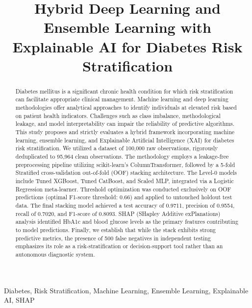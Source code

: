\documentclass[conference]{IEEEtran}
\begin{document}
\title{Hybrid Deep Learning and Ensemble Learning with Explainable AI for Diabetes Risk Stratification}

\author{
}

\maketitle
\begin{abstract}
Diabetes mellitus is a significant chronic health condition for which risk stratification can facilitate appropriate clinical management. Machine learning and deep learning methodologies offer analytical approaches to identify individuals at elevated risk based on patient health indicators. Challenges such as class imbalance, methodological leakage, and model interpretability can impair the reliability of predictive algorithms. This study proposes and strictly evaluates a hybrid framework incorporating machine learning, ensemble learning, and Explainable Artificial Intelligence (XAI) for diabetes risk stratification. We utilized a dataset of 100,000 raw observations, rigorously deduplicated to 95,964 clean observations. The methodology employs a leakage-free preprocessing pipeline utilizing scikit-learn's ColumnTransformer, followed by a 5-fold Stratified cross-validation out-of-fold (OOF) stacking architecture. The Level-0 models include Tuned XGBoost, Tuned CatBoost, and Scaled MLP, integrated via a Logistic Regression meta-learner. Threshold optimization was conducted exclusively on OOF predictions (optimal F1-score threshold: 0.66) and applied to untouched holdout test data. The final stacking model achieved a test accuracy of 0.9711, precision of 0.9554, recall of 0.7020, and F1-score of 0.8093. SHAP (SHapley Additive exPlanations) analysis identified HbA1c and blood glucose levels as the primary features contributing to model predictions. Finally, we establish that while the stack exhibits strong predictive metrics, the presence of 500 false negatives in independent testing emphasizes its role as a risk-stratification or decision-support tool rather than an autonomous diagnostic system.
\end{abstract}

\begin{IEEEkeywords}
Diabetes, Risk Stratification, Machine Learning, Ensemble Learning, Explainable AI, SHAP
\end{IEEEkeywords}
\end{document}
